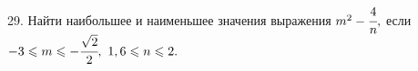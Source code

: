 29. Найти наибольшее и наименьшее значения выражения $m^2-\cfrac{4}{n},$ если $-3\leqslant m\leqslant-\cfrac{\sqrt{2}}{2},\ 1,6\leqslant n\leqslant 2.$\\
